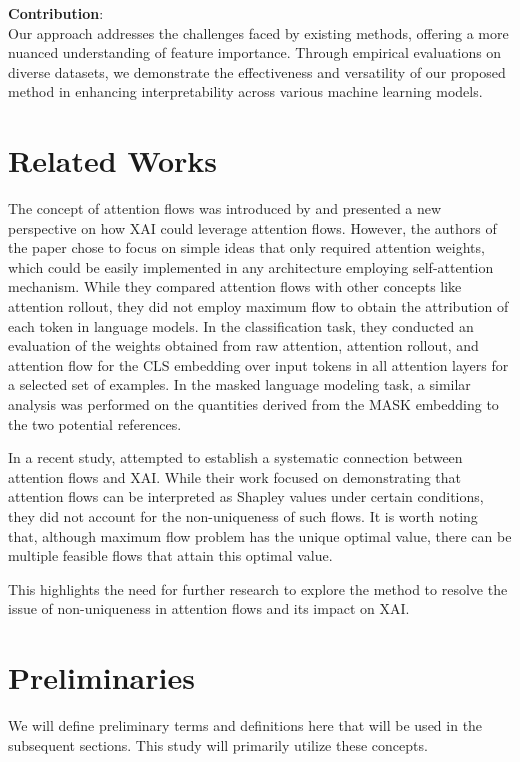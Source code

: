 \documentclass{article} %
\theoremstyle{bfnote}
\begin{document}
\textbf{Contribution}:\\ 
Our approach addresses the challenges faced by existing methods, offering a more nuanced understanding of feature importance. Through empirical evaluations on diverse datasets, we demonstrate the effectiveness and versatility of our proposed method in enhancing interpretability across various machine learning models.



\section{Related Works}
The concept of attention flows was introduced by \cite{abnar2020b} and presented a new perspective on how XAI could leverage attention flows. However, the authors of the paper chose to focus on simple ideas that only required attention weights, which could be easily implemented in any architecture employing self-attention mechanism. While they compared attention flows with other concepts like attention rollout, they did not employ maximum flow to obtain the attribution of each token in language models. In the classification task, they conducted an evaluation of the weights obtained from raw attention, attention rollout, and attention flow for the CLS embedding over input tokens in all attention layers for a selected set of examples. In the masked language modeling task, a similar analysis was performed on the quantities derived from the MASK embedding to the two potential references.

In a recent study, \cite{ethayarajh2021b} attempted to establish a systematic connection between attention flows and XAI. While their work focused on demonstrating that attention flows can be interpreted as Shapley values under certain conditions, they did not account for the non-uniqueness of such flows. It is worth noting that, although maximum flow problem has the unique optimal value, there can be multiple feasible flows that attain this optimal value. 

This highlights the need for further research to explore the method to resolve the issue of non-uniqueness in attention flows and its impact on XAI.

\section{Preliminaries}
We will define preliminary terms and definitions here that will be used in the subsequent sections. This study will primarily utilize these concepts.
\end{document}
